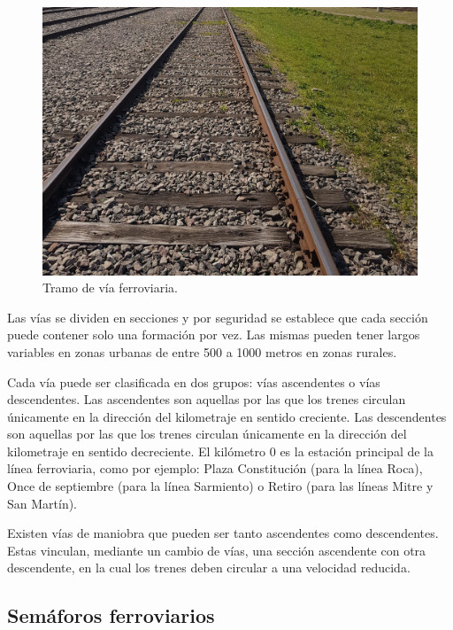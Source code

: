 			\begin{figure}[htbp!]
				\centering
				\includegraphics[scale=.07]{./Figures/Tramo_via}
				\caption{Tramo de vía ferroviaria.}
				\label{fig:Via_eclisa}
			\end{figure}	
			
			\vspace{7cm}
			
			Las vías se dividen en secciones y por seguridad se establece que cada sección puede contener solo una formación por vez. Las mismas pueden tener largos variables en zonas urbanas de entre 500 a 1000 metros en zonas rurales. 
			
			Cada vía puede ser clasificada en dos grupos: vías ascendentes o vías descendentes. Las ascendentes son aquellas por las que los trenes circulan únicamente en la dirección del kilometraje en sentido creciente. Las descendentes son aquellas por las que los trenes circulan únicamente en la dirección del kilometraje en sentido decreciente\citep{RITO}. El kilómetro 0 es la estación principal de la línea ferroviaria, como por ejemplo: Plaza Constitución (para la línea Roca), Once de septiembre (para la línea Sarmiento) o Retiro (para las líneas Mitre y San Martín).
			
			Existen vías de maniobra que pueden ser tanto ascendentes como descendentes. Estas vinculan, mediante un cambio de vías, una sección ascendente con otra descendente, en la cual los trenes deben circular a una velocidad reducida.
			
		\subsection{Semáforos ferroviarios}
			
